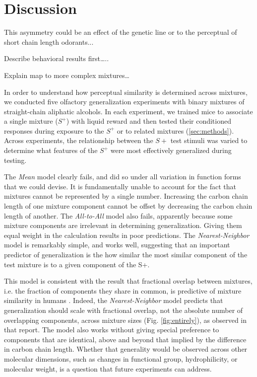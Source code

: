 \section*{Discussion}
\label{sec:discussion}

This asymmetry could be an effect of the genetic line or to the perceptual of short chain length odorants...

Describe behavioral results first…..

Explain map to more complex mixtures…

In order to understand how perceptual similarity is determined across mixtures, we conducted five olfactory generalization experiments with binary mixtures of straight-chain aliphatic alcohols.  
In each experiment, we trained mice to associate a single mixture ($S^+$) with liquid reward and then tested their conditioned responses during exposure to the $S^+$ or to related mixtures (\ref{sec:methods}).  
Across experiments, the relationship between the $S+$ test stimuli was varied to determine what features of the $S^+$ were most effectively generalized during testing.  

The \textit{Mean} model clearly fails, and did so under all variation in function forms that we could devise.  It is fundamentally unable to account for the fact that mixtures cannot be represented by a single number.  Increasing the carbon chain length of one mixture component cannot be offset by decreasing the carbon chain length of another.  The \textit{All-to-All} model also fails, apparently because some mixture components are irrelevant in determining generalization.  Giving them equal weight in the calculation results in poor predictions.  The \textit{Nearest-Neighbor} model is remarkably simple, and works well, suggesting that an important predictor of generalization is the how similar the most similar component of the test mixture is to a given component of the S+.  

This model is consistent with the result that fractional overlap between mixtures, i.e. the fraction of components they share in common, is predictive of mixture similarity in humans \cite{24653035}.  Indeed, the \textit{Nearest-Neighbor} model predicts that generalization should scale with fractional overlap, not the absolute number of overlapping components, across mixture sizes (Fig. \ref{fig:entirely}), as observed in that report.  The model also works without giving special preference to components that are identical, above and beyond that implied by the difference in carbon chain length.  Whether that generality would be observed across other molecular dimensions, such as changes in functional group, hydrophilicity, or molecular weight, is a question that future experiments can address.  

